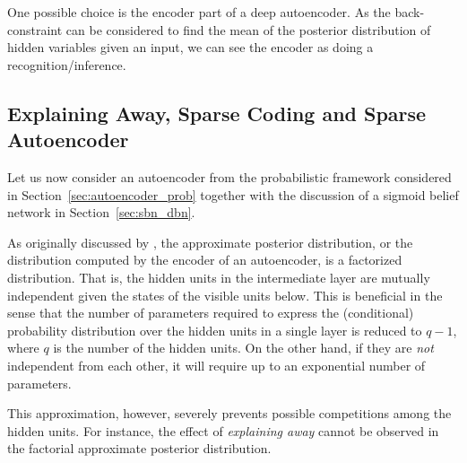\documentclass[dissertation,nocontribution]{aaltoseries}
\begin{document}
One 
possible choice is the encoder part of a deep
autoencoder. As the back-constraint can be considered to
find the mean of the posterior distribution of hidden
variables given an input, we can 
see the encoder
as doing a recognition/inference.


\subsection{Explaining Away, Sparse Coding and Sparse
Autoencoder}
\label{sec:explain_away}

Let us now consider an autoencoder from the probabilistic
framework considered in Section~\ref{sec:autoencoder_prob}
together with the discussion of a sigmoid belief network in
Section~\ref{sec:sbn_dbn}. 

As originally discussed by \citet{Hinton1995}, the
approximate posterior distribution, or the distribution
computed by the encoder of an autoencoder, is a factorized
distribution. That is, the hidden units in the intermediate
layer are mutually independent given the states of the
visible units below. This is beneficial in the sense that
the number of parameters required to express the
(conditional) probability distribution over the hidden units
in a single layer is reduced to $q-1$, where $q$ is the
number of the hidden units. On the other hand, if they are
\textit{not} independent from each other, it will require up
to an exponential number of parameters.

This approximation, however, severely prevents possible
competitions among the hidden units. For instance, the
effect of \textit{explaining away} \citep[see,
e.g.,][]{Wellman1993} cannot be observed in the factorial
approximate posterior distribution. 

\end{document}
